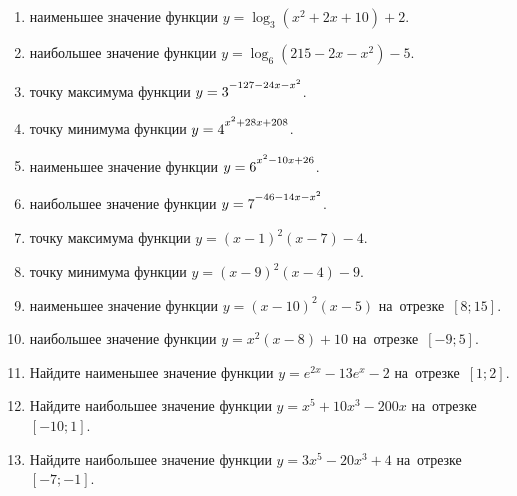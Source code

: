 \documentclass[a4paper,10pt]{article}
\begin{document}
\begin{enumerate}
\item {} наименьшее значение функции $y=\log_3\left(x^2+2x+10\right)+2$.

\item {} наибольшее значение функции $y=\log_6\left(215-2x-x^2\right)-5$.

\item {} точку максимума функции $y=3\strut^{-127-24x-x^2}$.

\item {} точку минимума функции $y=4\strut^{x^2+28x+208}$.

\item {} наименьшее значение функции $y=6\strut^{x^2-10x+26}$.

\item {} наибольшее значение функции $y=7\strut^{-46-14x-x^2}$.

\item {} точку максимума функции $y=\left(x-1\right)^2\left(x-7\right)-4$.

\item {} точку минимума функции $y=\left(x-9\right)^2\left(x-4\right)-9$.

\item {} наименьшее значение функции $y=\left(x-10\right)^2\left(x-5\right)$ на~отрезке~$\left[8;15\right]$.

\item {} наибольшее значение функции $y=x^2\left(x-8\right)+10$ на~отрезке~$\left[-9;5\right]$.

\item Найдите наименьшее значение функции $y=e^{2x}-13e^x-2$ на~отрезке~$\left[1;2\right]$.

\item Найдите наибольшее значение функции $y=x^5+10x^3-200x$ на~отрезке~$\left[-10;1\right]$.

\item Найдите наибольшее значение функции $y=3x^5-20x^3+4$ на~отрезке~$\left[-7;-1\right]$.

\end{enumerate}
\end{document}
